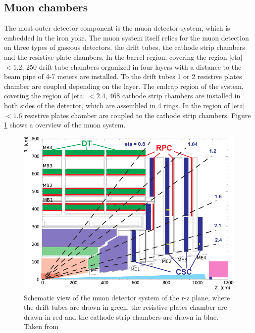 \subsection*{Muon chambers}

The most outer detector component is the muon detector system, which is embedded in the iron yoke. The muon system itself relies for the muon detection on three types of gaseous detectors, the drift tubes, the cathode strip chambers and the resistive plate chambers. In the barrel region, covering the region $|$\gls{eta}$|$ $< 1.2$, 250 drift tube chambers organized in four layers with a distance to the beam pipe of 4-7 meters are installed. To the drift tubes 1 or 2 resistive plates chamber are coupled depending on the layer. The endcap region of the system, covering the region of $|$\gls{eta}$|$ $< 2.4$, 468 cathode strip chambers are installed in both sides of the detector, which are assembled in 4 rings. In the region of $|$\gls{eta}$|$ $< 1.6$  resistive plates chamber are coupled to the cathode strip chambers. Figure \ref{fig:fig_2_10} shows a overview of the muon system.

\begin{figure}[ht]
	\centering
	\includegraphics[width=1\textwidth]{pictures/MUON_SYSTEM.pdf}

	\caption[Muon detector system of CMS]{Schematic view of the muon detector system of the r-z plane, where the drift tubes are drawn in green, the resistive plates chamber are drawn in red and the cathode strip chambers are drawn in blue. Taken from \cite{CMS2}}
	\label{fig:fig_2_10}
\end{figure}


